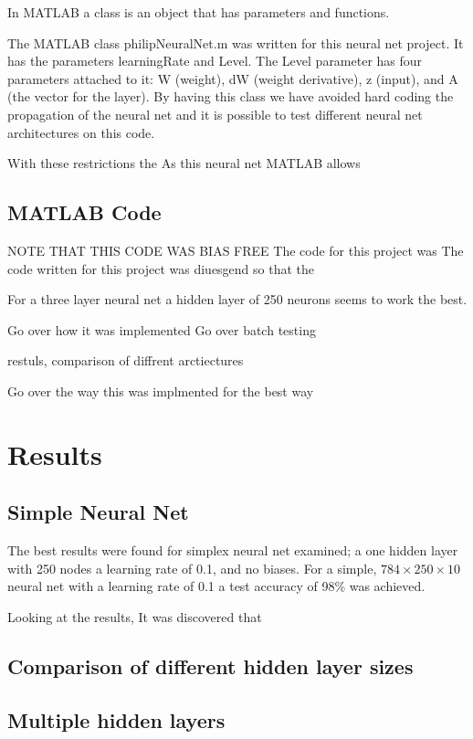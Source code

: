 \documentclass[12pt]{article}
\begin{document}
	In MATLAB a class is an object that has parameters and functions. 
	
	The MATLAB class philipNeuralNet.m was written for this neural net project. It has the parameters learningRate and Level. The Level parameter has four parameters attached to it: W (weight), dW (weight derivative),  z (input), and A (the vector for the layer). By having this class we have avoided hard coding the propagation of the neural net and it is possible to test different neural net architectures on this code. 
	
	With these restrictions the 
	As this neural net 
	MATLAB allows 
	\subsection{MATLAB Code}
	NOTE THAT THIS CODE WAS BIAS FREE
	The code for this project was 
	The code written for this project was diuesgend so that the 
	
	For a three layer neural net a hidden layer of 250 neurons seems to work the best\cite{matlabNNBeg}. 
	
	Go over how it was implemented
	Go over batch testing
	
	restuls, comparison of diffrent arctiectures
	
	Go over the way this was implmented for the best way
	
	
	
	
	\section{Results}
	\subsection{Simple Neural Net}
	The best results were found for simplex neural net examined; a one hidden layer with 250 nodes a learning rate of 0.1, and no biases. 
	For a simple, $784\times250\times10$ neural net with a learning rate of 0.1 a test accuracy of 98\% was achieved. 
	
	
	
	Looking at the results,  It was discovered that
	
	\subsection{Comparison of different hidden layer sizes}
	
	\subsection{Multiple hidden layers}
	
\end{document}
